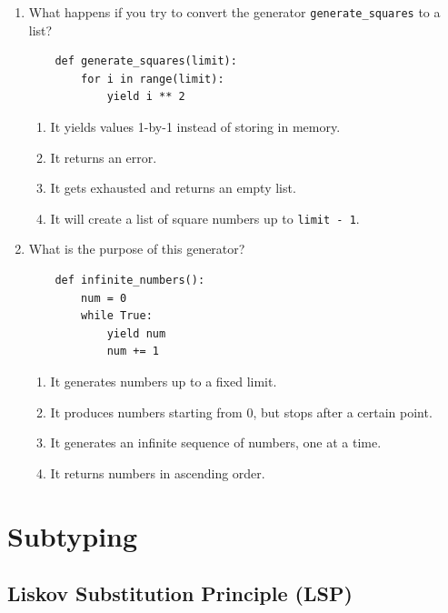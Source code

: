 \documentclass[oneside,11pt,dvipsnames]{book}
\newcommand{\code}[1]{\texttt{#1}}
\begin{document}
\begin{enumerate}

\item What happens if you try to convert the generator \texttt{generate\_squares} to a list?

\begin{lstlisting}
    def generate_squares(limit):
        for i in range(limit):
            yield i ** 2
    \end{lstlisting}

\begin{enumerate}
    \item It yields values 1-by-1 instead of storing in memory.
    \item It returns an error.
    \item It gets exhausted and returns an empty list.
    \item It will create a list of square numbers up to \code{limit - 1}.
\end{enumerate}



\item What is the purpose of this generator?
\begin{lstlisting}
    def infinite_numbers():
        num = 0
        while True:
            yield num
            num += 1
    \end{lstlisting}
\begin{enumerate}
    \item It generates numbers up to a fixed limit.
    \item It produces numbers starting from 0, but stops after a certain point.
    \item It generates an infinite sequence of numbers, one at a time.
    \item It returns numbers in ascending order.
\end{enumerate}

\end{enumerate}







\chapter{Subtyping}

\section{Liskov Substitution Principle (LSP)}
\end{document}
